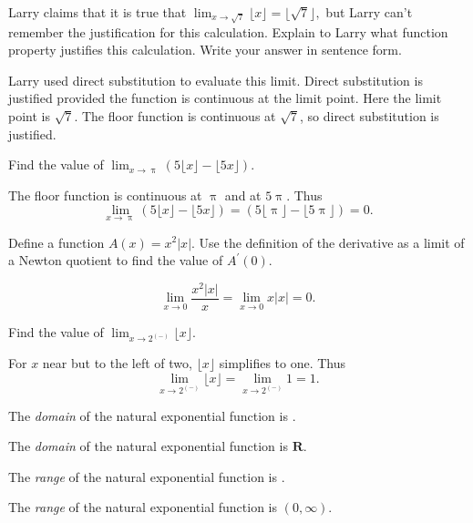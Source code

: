 \documentclass[12pt, fleqn]{exam}
\newcommand{\reals}{\mathbf{R}}
\begin{document}
\large


\vspace{0.1in}

\begin{questions} 

    \large


\question Larry claims that it is true that
$\displaystyle
    \lim_{x \to \sqrt{7}} \lfloor x \rfloor = \lfloor \sqrt{7} \rfloor,
$
but Larry can't remember the justification for this calculation. Explain to 
Larry what function property justifies this calculation. Write your answer in
sentence form.
\begin{solution} Larry used direct substitution to evaluate this limit. Direct
    substitution is justified provided the function is continuous at the limit 
    point.  Here the limit point is $\sqrt{7}$. The floor function is continuous 
    at $\sqrt{7}$, so direct substitution is justified.    
\end{solution}

\question Find the value of \(\displaystyle \lim_{x \to \uppi} 
\left(5 \lfloor x \rfloor -  \lfloor 5 x \rfloor  \right) \).
\begin{solution} The floor function is continuous at $\uppi$ and at $5 \uppi$. Thus
    \[
    \lim_{x \to \uppi} 
\left(5 \lfloor x \rfloor -  \lfloor 5 x \rfloor  \right) 
 = \left(5 \lfloor \uppi \rfloor -  \lfloor 5 \uppi \rfloor \right)
 = 0.
    \]
\end{solution}

\question Define a function $A(x) = x^2 |x|$. Use the definition of
the derivative as a limit of a Newton quotient to find the value of $A^\prime(0)$.
\begin{solution}   
    \[
    \lim_{x \to 0} \frac{x^2 |x|}{x} = \lim_{x \to 0} x |x| = 0.
    \]
\end{solution}
\question Find the value of \(\displaystyle \lim_{x \to 2^{(-)}} 
 \lfloor x \rfloor \).
\begin{solution}
For $x$ near but to the left of two, \(\lfloor x \rfloor \) simplifies
to one. Thus
\[
    \lim_{x \to 2^{(-)}}  \lfloor x \rfloor = \lim_{x \to 2^{(-)}} 1 = 1.
\]
\end{solution}
\question The \emph{domain} of the natural exponential function is \underline{\phantom{xxxxxxxxx}}.
\begin{solution}
    The \emph{domain} of the natural exponential function is $\reals$.
\end{solution}
\question The \emph{range} of the natural exponential function is  \underline{\phantom{xxxxxxxxx}}.
\begin{solution}
    The \emph{range} of the natural exponential function is $(0,\infty)$.
\end{solution}
    

\end{questions}
\end{document}
